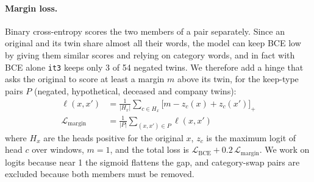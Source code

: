 \documentclass[11pt]{article}
\begin{document}
\paragraph{Margin loss.} Binary cross-entropy scores the two members of a pair separately. Since an original and its twin share almost all their words, the model can keep BCE low by giving them similar scores and relying on category words, and in fact with BCE alone \texttt{it3} keeps only 3 of 54 negated twins. We therefore add a hinge that asks the original to score at least a margin $m$ above its twin, for the keep-type pairs $P$ (negated, hypothetical, deceased and company twins):
\begin{align*}
\ell(x,x')&=\tfrac{1}{|H_x|}\textstyle\sum_{c\in H_x}\bigl[m-z_c(x)+z_c(x')\bigr]_+\\
\mathcal{L}_{\mathrm{margin}}&=\tfrac{1}{|P|}\textstyle\sum_{(x,x')\in P}\ell(x,x')
\end{align*}
where $H_x$ are the heads positive for the original $x$, $z_c$ is the maximum logit of head $c$ over windows, $m=1$, and the total loss is $\mathcal{L}_{\mathrm{BCE}}+0.2\,\mathcal{L}_{\mathrm{margin}}$. We work on logits because near 1 the sigmoid flattens the gap, and category-swap pairs are excluded because both members must be removed.
\end{document}
